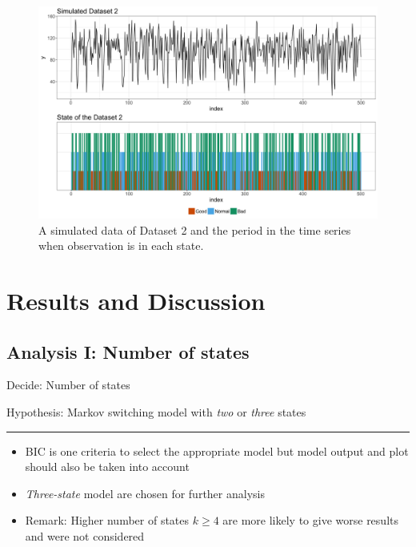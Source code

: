 \documentclass{beamer}
\begin{document}
\begin{frame}

\begin{figure}
	\includegraphics[width=1\linewidth]{sim2}
	\caption{A simulated data of Dataset 2 and the period in the time series when observation is in each state.}
\end{figure}

\end{frame}

\section{Results and Discussion}
\subsection{Analysis I: Number of states}
\begin{frame}
Decide: Number of states

Hypothesis: Markov switching model with \textit{two} or \textit{three} states
\rule{\textwidth}{0.4pt}

\begin{itemize}
	\item BIC is one criteria to select the appropriate model but model output and plot should also be taken into account
	\item \textit{Three-state} model are chosen for further analysis
	\item Remark: Higher number of states $k\geq4$ are more likely to give worse results and were not considered
\end{itemize}

\end{frame}
\end{document}
